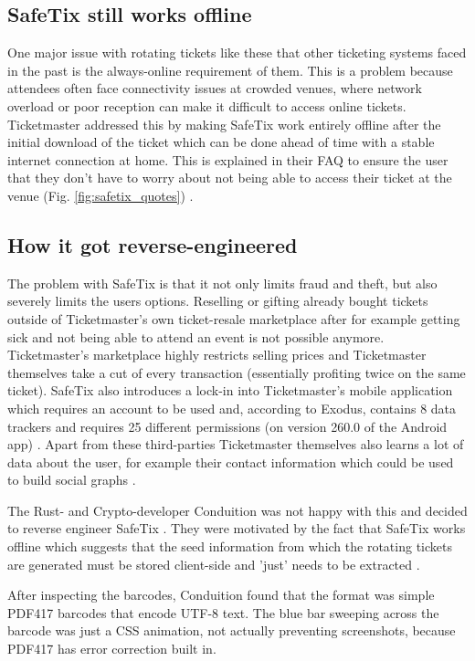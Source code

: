 \subsection{SafeTix still works offline}
One major issue with rotating tickets like these that other ticketing systems faced in the past is the always-online requirement of them. This is a problem because attendees often face connectivity issues at crowded venues, where network overload or poor reception can make it difficult to access online tickets. Ticketmaster addressed this by making SafeTix work entirely offline after the initial download of the ticket which can be done ahead of time with a stable internet connection at home. This is explained in their FAQ to ensure the user that they don't have to worry about not being able to access their ticket at the venue (Fig. \ref{fig:safetix_quotes}) \cite{ticketmaster_safetix_faq}. 

\subsection{How it got reverse-engineered}
The problem with SafeTix is that it not only limits fraud and theft, but also severely limits the users options. Reselling or gifting already bought tickets outside of Ticketmaster's own ticket-resale marketplace after for example getting sick and not being able to attend an event is not possible anymore. Ticketmaster's marketplace highly restricts selling prices and Ticketmaster themselves take a cut of every transaction (essentially profiting twice on the same ticket). SafeTix also introduces a lock-in into Ticketmaster's mobile application which requires an account to be used and, according to Exodus, contains 8 data trackers and requires 25 different permissions (on version 260.0 of the Android app) \cite{exodus}. Apart from these third-parties Ticketmaster themselves also learns a lot of data about the user, for example their contact information which could be used to build social graphs \cite{reverse_engineering_ticketmaster}.

The Rust- and Crypto-developer Conduition was not happy with this and decided to reverse engineer SafeTix \cite{conduition}. They were motivated by the fact that SafeTix works offline which suggests that the seed information from which the rotating tickets are generated must be stored client-side and 'just' needs to be extracted \cite{reverse_engineering_ticketmaster}.

After inspecting the barcodes, Conduition found that the format was simple PDF417 barcodes that encode UTF-8 text. 
The blue bar sweeping across the barcode was just a CSS animation, not actually preventing screenshots, because PDF417 has error correction built in.

